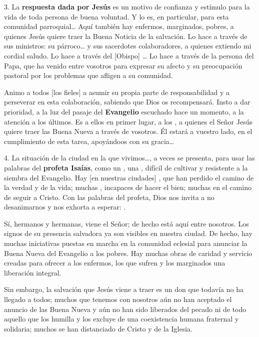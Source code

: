 \begin{body}
					3. La \textbf{respuesta dada por Jesús} es un motivo de confianza y estímulo para la vida de toda persona de buena voluntad. Y lo es, en particular, para esta comunidad parroquial\ldots{} Aquí también hay enfermos, marginados, pobres, a quienes Jesús quiere traer la Buena Noticia de la salvación. Lo hace a través de sus ministros: su párroco\ldots{} y sus sacerdotes colaboradores, a quienes extiendo mi cordial saludo. Lo hace a través del {[}Obispo{]} \ldots{} Lo hace a través de la persona del Papa, que ha venido entre vosotros para expresar su afecto y su preocupación pastoral por los problemas que afligen a su comunidad.
					
					Animo a todos {[}los fieles{]} a asumir su propia parte de responsabilidad y a perseverar en esta colaboración, sabiendo que Dios os recompensará. Insto a dar prioridad, a la luz del pasaje del \textbf{Evangelio} escuchado hace un momento, a la atención a los últimos. Es a ellos en primer lugar, a los , a quienes el Señor Jesús quiere traer las Buena Nueva a través de vosotros. Él estará a vuestro lado, en el cumplimiento de esta tarea, apoyándoos con su gracia\ldots{}
					
					4. La situación de la ciudad en la que vivimos\ldots{}, a veces se presenta, para usar las palabras del \textbf{profeta Isaías}, como un , una , difícil de cultivar y resistente a la siembra del Evangelio. Hay {[}en nuestras ciudades{]} , que han perdido el camino de la verdad y de la vida; muchas , incapaces de hacer el bien; muchas  en el camino de seguir a Cristo. Con las palabras del profeta, Dios nos invita a no desanimarnos y nos exhorta a esperar: .
					
					Sí, hermanos y hermanas, viene el Señor; de hecho está aquí entre nosotros. Los signos de su presencia salvadora ya son visibles en nuestra ciudad. De hecho, hay muchas iniciativas puestas en marcha en la comunidad eclesial para anunciar la Buena Nueva del Evangelio a los pobres. Hay muchas obras de caridad y servicio creadas para ofrecer a los enfermos, los que sufren y los marginados una liberación integral.
					
					Sin embargo, la salvación que Jesús viene a traer es un don que todavía no ha llegado a todos; muchos  que tenemos con nosotros aún no han aceptado el anuncio de las Buena Nueva y aún no han sido liberados del pecado ni de todo aquello que los humilla y los excluye de una coexistencia humana fraternal y solidaria; muchos  se han distanciado de Cristo y de la Iglesia.
					

\end{body}
